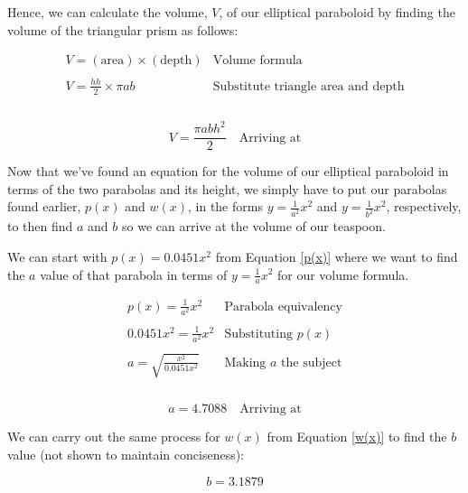 \documentclass[12pt]{article}
\begin{document}
Hence, we can calculate the volume, $V$, of our elliptical paraboloid by finding the volume of the triangular prism as follows:

$$
\begin{array}{l|c}
    V = (\text{area}) \times (\text{depth}) & \text{Volume formula} \\ \\
    V = \frac{hh}{2} \times \pi ab & \text{Substitute triangle area and depth} \\ \\
 \end{array}
$$

\begin{equation}\label{volume}
    \boxed{V = \frac{\pi a b h^2}{2}}  \quad \text{Arriving at}
\end{equation}

Now that we've found an equation for the volume of our elliptical paraboloid in terms of the two parabolas and its height, we simply have to put our parabolas found earlier, $p(x)$ and $w(x)$, in the forms $y=\frac{1}{a^2}x^2$ and $y=\frac{1}{b^2}x^2$, respectively, to then find $a$ and $b$ so we can arrive at the volume of our teaspoon.

We can start with $p(x)=0.0451x^2$ from Equation \ref{p(x)} where we want to find the $a$ value of that parabola in terms of $y=\frac{1}{a}x^2$ for our volume formula.

$$
\begin{array}{l|c}
    p(x) = \frac{1}{a^2}x^2 & \text{Parabola equivalency} \\ \\
    0.0451x^2 = \frac{1}{a^2}x^2 & \text{Substituting } p(x) \\ \\
    a = \sqrt{ \frac{x^2}{0.0451x^2}} & \text{Making } a \text{ the subject} \\ \\
 \end{array}
$$

\begin{equation}\label{solve.a!}
    \boxed{a = 4.7088}  \quad \text{Arriving at}
\end{equation}

We can carry out the same process for $w(x)$ from Equation \ref{w(x)} to find the $b$ value (not shown to maintain conciseness):

\begin{equation}\label{solve.b!}
    \boxed{b = 3.1879}
\end{equation}
\end{document}
